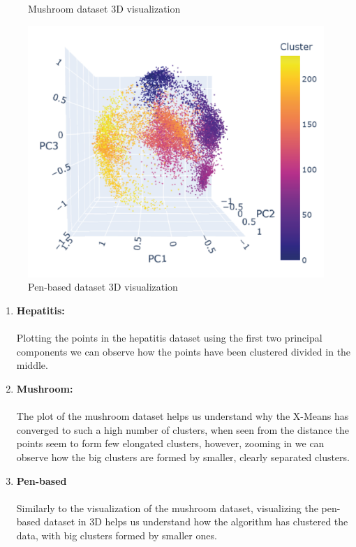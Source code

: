 \begin{figure}[H]
\begin{minipage}[b]{0.45\linewidth}
        \caption{Mushroom dataset 3D visualization}
    \end{minipage}
\end{figure}

\begin{figure}[H]
    \centering
    \includegraphics[width=0.6\linewidth]{figures/XMeans/pen-based_visualization.png}
    \caption{Pen-based dataset 3D visualization}
\end{figure}

\begin{enumerate}
    \item \textbf{Hepatitis:}
        \\\\Plotting the points in the hepatitis dataset using the first two principal components we can observe how the points have been clustered divided in the middle.

    \item \textbf{Mushroom:}
        \\\\The plot of the mushroom dataset helps us understand why the X-Means has converged to such a high number of clusters, when seen from the distance the points seem to form few elongated clusters, however, zooming in we can observe how the big clusters are formed by smaller, clearly separated clusters.

    \item \textbf{Pen-based} 
    \\\\ Similarly to the visualization of the mushroom dataset, visualizing the pen-based dataset in 3D helps us understand how the algorithm has clustered the data, with big clusters formed by smaller ones.


\end{enumerate}